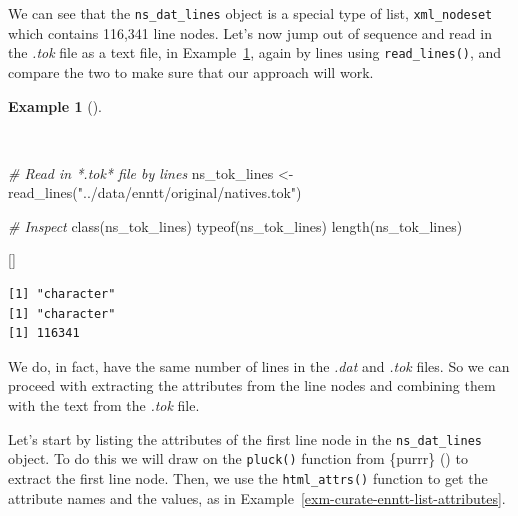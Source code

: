 \documentclass[
  letterpaper,
  krantz1]{latex/krantz-mod}
\newenvironment{Shaded}{\begin{snugshade}}{\end{snugshade}}
\newcommand{\CommentTok}[1]{\textcolor[rgb]{0.00,0.00,0.00}{\textit{#1}}}
\newcommand{\FunctionTok}[1]{\textcolor[rgb]{0.00,0.00,0.00}{#1}}
\newcommand{\NormalTok}[1]{\textcolor[rgb]{0.00,0.00,0.00}{#1}}
\newcommand{\OtherTok}[1]{\textcolor[rgb]{0.00,0.00,0.00}{#1}}
\newcommand{\StringTok}[1]{\textcolor[rgb]{0.00,0.00,0.00}{#1}}
\newcommand{\cindex}[1]{%
  \StrSubstitute{#1}{_}{\_}[\temp]%
  \index{\temp}%
}
\theoremstyle{definition}
\theoremstyle{definition}
\newtheorem{example}{Example}[chapter]
\theoremstyle{remark}
\begin{document}
We can see that the \texttt{ns\_dat\_lines} object is a special type of
list, \texttt{xml\_nodeset} which contains 116,341 line nodes. Let's now
jump out of sequence and read in the \emph{.tok} file as a text file, in
Example~\ref{exm-curate-enntt-read-lines}, again by lines using
\texttt{read\_lines()}, and compare the two to make sure that our
approach will work.

\begin{example}[]\protect\hypertarget{exm-curate-enntt-read-lines}{}\label{exm-curate-enntt-read-lines}

~

\begin{Shaded}
\begin{Highlighting}[numbers=left,,]
\CommentTok{\# Read in *.tok* file by lines}
\NormalTok{ns\_tok\_lines }\OtherTok{\textless{}{-}}
  \FunctionTok{read\_lines}\NormalTok{(}\StringTok{"../data/enntt/original/natives.tok"}\NormalTok{)}

\CommentTok{\# Inspect}
\FunctionTok{class}\NormalTok{(ns\_tok\_lines)}
\FunctionTok{typeof}\NormalTok{(ns\_tok\_lines)}
\FunctionTok{length}\NormalTok{(ns\_tok\_lines)}
\end{Highlighting}
\end{Shaded}

\cindex{read_lines()}

\begin{verbatim}
[1] "character"
[1] "character"
[1] 116341
\end{verbatim}

\end{example}

We do, in fact, have the same number of lines in the \emph{.dat} and
\emph{.tok} files. So we can proceed with extracting the
attributes from the line nodes and combining them with
the text from the \emph{.tok} file.

Let's start by listing the attributes of the first line node in the
\texttt{ns\_dat\_lines} object. To do this we will draw on the
\texttt{pluck()} function from \{purrr\} () to extract the first line node. Then, we use the
\texttt{html\_attrs()} function to get the attribute names and the
values, as in
Example~\ref{exm-curate-enntt-list-attributes}.

\pagebreak
\end{document}
